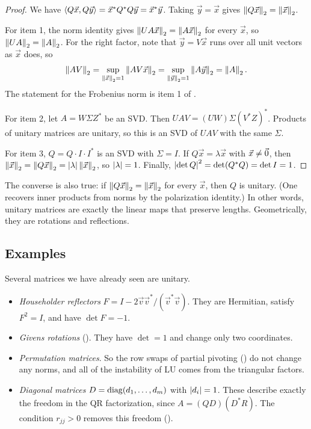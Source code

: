 \begin{proof}
  We have $\left\langle Q\vec{x}, Q\vec{y} \right\rangle = \vec{x}^\ast Q^\ast Q\vec{y} = \vec{x}^\ast\vec{y}$. Taking $\vec{y} = \vec{x}$ gives $\left\lVert Q\vec{x} \right\rVert_2 = \left\lVert \vec{x} \right\rVert_2$.

  For item 1, the norm identity gives $\left\lVert UA\vec{x} \right\rVert_2 = \left\lVert A\vec{x} \right\rVert_2$ for every $\vec{x}$, so $\left\lVert UA \right\rVert_2 = \left\lVert A \right\rVert_2$. For the right factor, note that $\vec{y} = V\vec{x}$ runs over all unit vectors as $\vec{x}$ does, so
  \begin{equation}
    \left\lVert AV \right\rVert_2 = \sup_{\left\lVert \vec{x} \right\rVert_2 = 1}\left\lVert AV\vec{x} \right\rVert_2 = \sup_{\left\lVert \vec{y} \right\rVert_2 = 1}\left\lVert A\vec{y} \right\rVert_2 = \left\lVert A \right\rVert_2.
  \end{equation}
  The statement for the Frobenius norm is item 1 of .

  For item 2, let $A = W\Sigma Z^\ast$ be an SVD. Then $UAV = (UW)\Sigma(V^\ast Z)^\ast$. Products of unitary matrices are unitary, so this is an SVD of $UAV$ with the same $\Sigma$.

  For item 3, $Q = Q \cdot I \cdot I^\ast$ is an SVD with $\Sigma = I$. If $Q\vec{x} = \lambda\vec{x}$ with $\vec{x} \ne \vec{0}$, then $\left\lVert \vec{x} \right\rVert_2 = \left\lVert Q\vec{x} \right\rVert_2 = \left\lvert \lambda \right\rvert\left\lVert \vec{x} \right\rVert_2$, so $\left\lvert \lambda \right\rvert = 1$. Finally, $\left\lvert \det Q \right\rvert^2 = \det(Q^\ast Q) = \det I = 1$.
\end{proof}

The converse is also true: if $\left\lVert Q\vec{x} \right\rVert_2 = \left\lVert \vec{x} \right\rVert_2$ for every $\vec{x}$, then $Q$ is unitary. (One recovers inner products from norms by the polarization identity.) In other words, unitary matrices are exactly the linear maps that preserve lengths. Geometrically, they are rotations and reflections.

\subsection{Examples}

Several matrices we have already seen are unitary.
\begin{itemize}
  \item \emph{Householder reflectors} $F = I - 2\vec{v}\vec{v}^\ast/(\vec{v}^\ast\vec{v})$. They are Hermitian, satisfy $F^2 = I$, and have $\det F = -1$.
  \item \emph{Givens rotations} (). They have $\det = 1$ and change only two coordinates.
  \item \emph{Permutation matrices}. So the row swaps of partial pivoting () do not change any norms, and all of the instability of LU comes from the triangular factors.
  \item \emph{Diagonal matrices} $D = \operatorname{diag}(d_1, \dots, d_m)$ with $\left\lvert d_i \right\rvert = 1$. These describe exactly the freedom in the QR factorization, since $A = (QD)(D^\ast R)$. The condition $r_{jj} > 0$ removes this freedom ().
\end{itemize}

